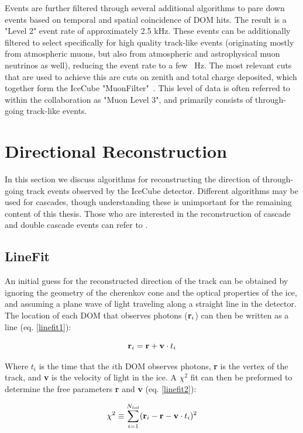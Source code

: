 Events are further filtered through several additional algorithms to pare down events based on temporal and spatial coincidence of DOM hits. The result is a "Level 2" event rate of approximately 2.5 kHz. These events can be additionally filtered to select specifically for high quality track-like events (originating mostly from atmospheric muons, but also from atmospheric and astrophysical muon neutrinos as well), reducing the event rate to a few ~Hz. The most relevant cuts that are used to achieve this are cuts on zenith and total charge deposited, which together form the IceCube "MuonFilter"~\cite{muonfilter_ref}.  This level of data is often referred to within the collaboration as "Muon Level 3", and primarily consists of through-going track-like events. 

\section{Directional Reconstruction}
In this section we discuss algorithms for reconstructing the direction of through-going track events observed by the IceCube detector. Different algorithms may be used for cascades, though understanding these is unimportant for the remaining content of this thesis. Those who are interested in the reconstruction of cascade and double cascade events can refer to \cite{AustinThesis}.

\subsection{LineFit}
An initial guess for the reconstructed direction of the track can be obtained by ignoring the geometry of the cherenkov cone and the optical properties of the ice, and assuming a plane wave of light traveling along a straight line in the detector. The location of each DOM that observes photons ($\textbf r_i$) can then be written as a line (eq. \ref{linefit1}):

\begin{equation}
    \textbf r_i = \textbf r + \textbf v \cdot t_i
    \label{linefit1}
\end{equation}

Where $t_i$ is the time that the $i$th DOM observes photons, \textbf{r} is the vertex of the track, and \textbf{v} is the velocity of light in the ice. A $\chi^2$ fit can then be preformed to determine the free parameters \textbf{r} and \textbf{v} (eq. \ref{linefit2}):

\begin{equation}
    \chi^2 \equiv \sum_{i=1}^{N_{tot}}(\textbf r_i - \textbf r - \textbf v \cdot t_i)^2
    \label{linefit2}
\end{equation}

